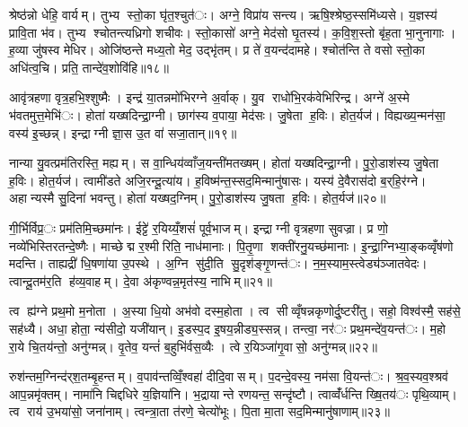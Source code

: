श्रेष्ठ॑न्नो धेहि॒ वार्यम्। तुभ्य स्तो॒का घृ॑त॒श्चुत॑ः। अग्ने॒ विप्रा॑य सन्त्य। ऋषि॒श्श्रेष्ठ॒स्समि॑ध्यसे। य॒ज्ञस्य॑ प्रावि॒ता भ॑व। तुभ्य श्चोतन्त्यध्रिगो शचीवः। स्तो॒कासो॑ अग्ने॒ मेद॑सो घृ॒तस्य॑। क॒वि॒श॒स्तो बृ॑ह॒ता भा॒नुनागाः। ह॒व्या जु॑षस्व मेधिर। ओजि॑ष्ठन्ते मध्य॒तो मेद॒ उद्भृ॑तम्। प्र ते॑ व॒यन्द॑दामहे। श्चोत॑न्ति ते वसो स्तो॒का अधि॑त्व॒चि। प्रति॒ तान्दे॑व॒शोवि॑हि॥१८॥


आवृ॑त्रहणा वृत्र॒हभि॒श्शुष्मैः। इन्द्र॑ या॒तन्नमो॑भिरग्ने अ॒र्वाक्। यु॒व राधो॑भि॒रक॑वेभिरिन्द्र। अग्ने॑ अ॒स्मे भ॑वतमुत्त॒मेभि॑ः। होता॑ यख्षदिन्द्रा॒ग्नी। छाग॑स्य व॒पाया॒ मेद॑सः। जु॒षेता ह॒विः। होत॒र्यज॑। विह्यख्य॒न्मन॑सा॒ वस्य॑ इ॒च्छन्न्। इन्द्राग्नी ज्ञा॒स उ॒त वा॑ सजा॒तान्॥१९॥

नान्या यु॒वत्प्रम॑तिरस्ति॒ मह्यम्। स वा॒न्धिय॑व्वाँज॒यन्ती॑मतख्षम्। होता॑ यख्षदिन्द्रा॒ग्नी। पु॒रो॒डाश॑स्य जु॒षेता ह॒विः। होत॒र्यज॑। त्वामी॑डते अजि॒रन्दू॒त्या॑य। ह॒विष्म॑न्त॒स्सद॒मिन्मानु॑षासः। यस्य॑ दे॒वैरास॑दो ब॒र्‌हि॒र॑ग्ने। अहान्यस्मै सु॒दिना॑ भवन्तु। होता॑ यख्षद॒ग्निम्। पु॒रो॒डाश॑स्य जु॒षता ह॒विः। होत॒र्यज॑॥२०॥


गी॒र्भिर्विप्र॒ः प्रम॑तिमि॒च्छमा॑नः। ईट्टे॑ र॒यिय्यँ॒शसं॑ पूर्व॒भाजम्। इन्द्राग्नी वृत्रहणा सुवज्रा। प्र णो॒ नव्ये॑भिस्तिरतन्दे॒ष्णैः। माच्छेद्म र॒श्मीरिति॒ नाध॑मानाः। पि॒तृ॒णा शक्ती॑रनु॒यच्छ॑मानाः। इ॒न्द्रा॒ग्निभ्या॒ङ्कव्वृँष॑णो मदन्ति। ताह्यद्री॑ धि॒षणा॑या उ॒पस्थे। अ॒ग्नि सु॑दी॒ति सु॒दृश॑ङ्गृ॒णन्त॑ः। न॒म॒स्याम॒स्त्वेड्य॑ञ्जातवेदः। त्वान्दू॒तम॑र॒ति ह॑व्य॒वाहम्। दे॒वा अ॑कृण्वन्न॒मृत॑स्य॒ नाभिम्॥२१॥


त्व ह्य॑ग्ने प्रथ॒मो म॒नोता। अ॒स्या धि॒यो अभ॑वो दस्म॒होता। त्व सीव्वृँषन्नकृणोर्दु॒ष्टरी॑तु। सहो॒ विश्व॑स्मै॒ सह॑से॒ सह॑ध्यै। अधा॒ होता॒ न्य॑सीदो॒ यजी॑यान्। इ॒डस्प॒द इ॒षय॒न्नीड्य॒स्सन्न्। तन्त्वा॒ नर॑ः प्रथ॒मन्दे॑व॒यन्त॑ः। म॒हो रा॒ये चि॒तय॑न्तो॒ अनु॑ग्मन्न्। वृ॒तेव॒ यन्तं॑ ब॒हुभि॑र्वस॒व्यैः। त्वे र॒यिञ्जा॑गृ॒वासो॒ अनु॑ग्मन्न्॥२२॥

रुश॑न्तम॒ग्निन्द॑र्‌श॒तम्बृ॒हन्तम्। व॒पाव॑न्तव्विँ॒श्वहा॑ दीदि॒वासम्। प॒दन्दे॒वस्य॒ नम॑सा वि॒यन्त॑ः। श्र॒व॒स्यव॒श्श्रव॑ आप॒न्नमृ॑क्तम्। नामा॑नि चिद्दधिरे य॒ज्ञिया॑नि। भ॒द्रायान्ते रणयन्त॒ सन्दृ॑ष्टौ। त्वाव्वँ॑र्धन्ति ख्षि॒तय॑ः पृथि॒व्याम्। त्व राय॑ उ॒भया॑सो॒ जना॑नाम्। त्वन्त्रा॒ता त॑रणे॒ चेत्यो॑भूः। पि॒ता मा॒ता सद॒मिन्मानु॑षाणाम्॥२३॥

